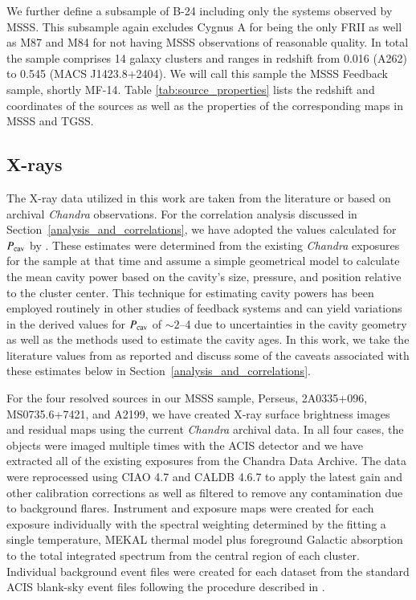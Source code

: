 \documentclass{aa}  %
\begin{document}
We further define a subsample of B-24 including only the systems observed by MSSS.
This subsample again excludes Cygnus A for being the only FRII as well as M87 and M84 for not having MSSS observations of reasonable quality. 
In total the sample comprises 14 galaxy clusters and ranges in redshift from 0.016 (A262) to 0.545 (MACS J1423.8+2404). We will call this sample the MSSS Feedback sample, shortly MF-14.
Table \ref{tab:source_properties} lists the redshift and coordinates of the sources as well as the properties of the corresponding maps in MSSS and TGSS.






\subsection{X-rays}
\label{lab:Xray_Pcav_data}

The X-ray data utilized in this work are taken from the literature or based on archival \textit{Chandra} observations. For the correlation analysis discussed in Section~\ref{analysis_and_correlations}, we have adopted the values calculated for $P_{\rm cav}$ by \cite{Rafferty2006}. These estimates were determined from the existing \textit{Chandra} exposures for the sample at that time and assume a simple geometrical model to calculate the mean cavity power based on the cavity's size, pressure, and position relative to the cluster center. This technique for estimating cavity powers has been employed routinely in other studies of feedback systems and can yield variations in the derived values for $P_{\rm cav}$ of $\sim2$--4 due to uncertainties in the cavity geometry as well as the methods used to estimate the cavity ages. In this work, we take the literature values from \cite{Rafferty2006} as reported and discuss some of the caveats associated with these estimates below in Section~\ref{analysis_and_correlations}.

For the four resolved sources in our MSSS sample, Perseus, 2A0335+096, MS0735.6+7421, and A2199, we have created X-ray surface brightness images and residual maps using the current \textit{Chandra} archival data. In all four cases, the objects were imaged multiple times with the ACIS detector and we have extracted all of the existing exposures from the Chandra Data Archive. The data were reprocessed using CIAO 4.7 and CALDB 4.6.7 to apply the latest gain and other calibration corrections as well as filtered to remove any contamination due to background flares. Instrument and exposure maps were created for each exposure individually with the spectral weighting determined by the fitting a single temperature, MEKAL thermal model \citep{Mewe85,Liedahl95} plus foreground Galactic absorption to the total integrated spectrum from the central region of each cluster. Individual background event files were created for each dataset from the standard ACIS blank-sky event files following the procedure described in \cite{Vikhlinin05}.
\end{document}
